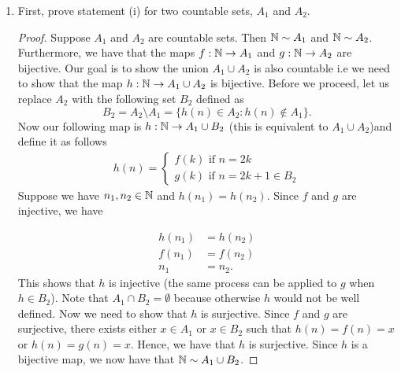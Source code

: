 \begin{enumerate}
    \item First, prove statement (i) for two countable sets, \( A_1 \) and \( A_2 \).
    \begin{proof}
    Suppose \( A_1 \) and \( A_2 \) are countable sets. Then \( \mathbb{N} \sim A_1 \) and \( \mathbb{N} \sim A_2 \). Furthermore, we have that the maps \( f: \mathbb{N} \to A_1 \) and \( g: \mathbb{N} \to A_2 \) are bijective. Our goal is to show the union \( A_1 \cup A_2 \) is also countable i.e we need to show that 
    the map \( h: \mathbb{N} \to A_1 \cup A_2 \) is bijective. Before we proceed, let us replace \( A_2 \) with the following set \( B_2 \) defined as 
    \[ B_2 = A_2 \setminus A_1 = \{ h(n) \in A_2 : h(n) \not\in A_1 \}.\]
Now our following map is \( h: \mathbb{N} \to A_1 \cup B_2\) (this is equivalent to \( A_1 \cup A_2 \))and define it as follows
\begin{align*}
  h(n) = \begin{cases}
          f(k) \text{ if } n=2k              \\
          g(k)    \text{ if } n=2k+1 \in B_2
        \end{cases}
\end{align*}
Suppose we have \( n_1, n_2 \in \mathbb{N} \) and \( h(n_1) = h(n_2) \). Since \( f \) and \( g \) are injective, we have 

\begin{align*}
   h(n_1) &= h(n_2) \\
   f(n_1) &= f(n_2) \\ 
   n_1 &= n_2.
\end{align*}
This shows that \( h \) is injective (the same process can be applied to \( g \) when \( h \in B_2 \)). Note that \( A_1 \cap B_2 = \emptyset \) because otherwise \( h \) would not be well defined. Now we need to show that \( h \) is surjective. Since \( f \) and \( g \) are surjective, there exists either \( x \in A_1 \) or \( x \in B_2 \) such that \( h(n) = f(n) = x \) or \( h(n) = g(n) = x \). Hence, we have that \( h \) is surjective. 
Since \( h \) is a bijective map, we now have that \( \mathbb{N}  \sim A_1 \cup B_2 \).


\end{proof}
\end{enumerate}
